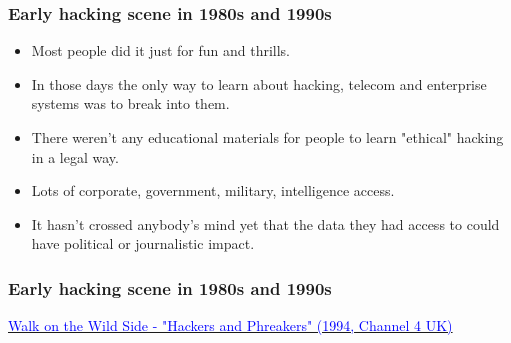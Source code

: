 \documentclass[aspectratio=169,usenames,dvipsnames]{beamer}
\begin{document}
\begin{frame}
  \frametitle{Early hacking scene in 1980s and 1990s}

  \begin{itemize}[<+->]
    \item Most people did it just for fun and thrills.
    \item In those days the only way to learn about hacking, telecom and
      enterprise systems was to break into them.
    \item There weren't any educational materials for people to learn
      "ethical" hacking in a legal way.
    \item Lots of corporate, government, military, intelligence access.
    \item It hasn't crossed anybody's mind yet that the data they had access
      to could have political or journalistic impact.
  \end{itemize}
\end{frame}

\begin{frame}
  \frametitle{Early hacking scene in 1980s and 1990s}

  \centering


  \footnotesize
  \href{https://www.youtube.com/watch?v=0a_4IR4v5no&t=770}{\textcolor{blue}{Walk
  on the Wild Side - "Hackers and Phreakers" (1994, Channel 4 UK)}}
\end{frame}
\end{document}
